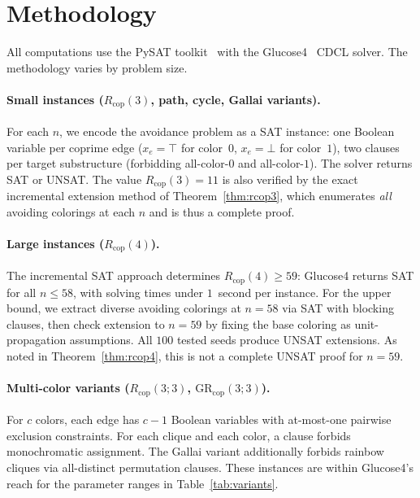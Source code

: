 \documentclass[11pt]{article}
\theoremstyle{plain}
\theoremstyle{definition}
\newcommand{\Rcop}{R_{\mathrm{cop}}}
\newcommand{\GRcop}{\mathrm{GR}_{\mathrm{cop}}}
\begin{document}
\section{Methodology}\label{sec:method}

All computations use the PySAT toolkit~\cite{pysat} with the
Glucose4~\cite{glucose} CDCL solver. The methodology varies by problem
size.

\paragraph{Small instances ($\Rcop(3)$, path, cycle, Gallai variants).}
For each $n$, we encode the avoidance problem as a SAT instance: one
Boolean variable per coprime edge ($x_e=\top$ for color~$0$, $x_e=\bot$
for color~$1$), two clauses per target substructure (forbidding
all-color-$0$ and all-color-$1$). The solver returns SAT or UNSAT. The
value $\Rcop(3)=11$ is also verified by the exact incremental extension
method of Theorem~\ref{thm:rcop3}, which enumerates \emph{all} avoiding
colorings at each $n$ and is thus a complete proof.

\paragraph{Large instances ($\Rcop(4)$).}
The incremental SAT approach determines $\Rcop(4)\ge 59$: Glucose4
returns SAT for all $n\le 58$, with solving times under $1$~second per
instance. For the upper bound, we extract diverse avoiding colorings at
$n=58$ via SAT with blocking clauses, then check extension to $n=59$ by
fixing the base coloring as unit-propagation assumptions. All $100$
tested seeds produce UNSAT extensions. As noted in
Theorem~\ref{thm:rcop4}, this is not a complete UNSAT proof for $n=59$.

\paragraph{Multi-color variants ($\Rcop(3;3)$, $\GRcop(3;3)$).}
For $c$ colors, each edge has $c-1$ Boolean variables with
at-most-one pairwise exclusion constraints. For each clique and each
color, a clause forbids monochromatic assignment. The Gallai variant
additionally forbids rainbow cliques via all-distinct permutation
clauses. These instances are within Glucose4's reach for the parameter
ranges in Table~\ref{tab:variants}.
\end{document}
